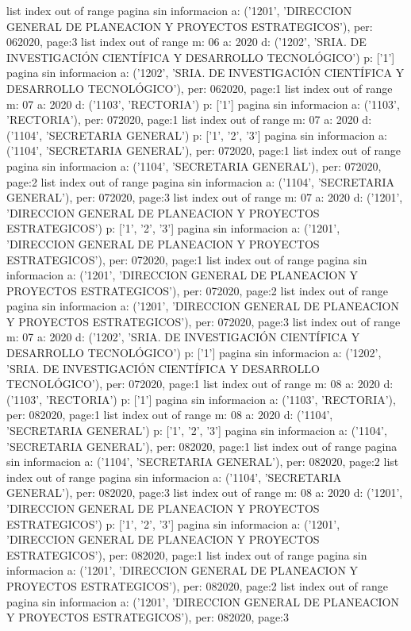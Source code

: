 \documentclass[11pt]{article}
\begin{document}
list index out of range
pagina sin informacion a: ('1201', 'DIRECCION GENERAL DE PLANEACION Y PROYECTOS ESTRATEGICOS'), per: 062020, page:3
list index out of range
m: 06 a: 2020 d: ('1202', 'SRIA. DE INVESTIGACIÓN CIENTÍFICA Y DESARROLLO TECNOLÓGICO') p: ['1']
pagina sin informacion a: ('1202', 'SRIA. DE INVESTIGACIÓN CIENTÍFICA Y DESARROLLO TECNOLÓGICO'), per: 062020, page:1
list index out of range
m: 07 a: 2020 d: ('1103', 'RECTORIA') p: ['1']
pagina sin informacion a: ('1103', 'RECTORIA'), per: 072020, page:1
list index out of range
m: 07 a: 2020 d: ('1104', 'SECRETARIA GENERAL') p: ['1', '2', '3']
pagina sin informacion a: ('1104', 'SECRETARIA GENERAL'), per: 072020, page:1
list index out of range
pagina sin informacion a: ('1104', 'SECRETARIA GENERAL'), per: 072020, page:2
list index out of range
pagina sin informacion a: ('1104', 'SECRETARIA GENERAL'), per: 072020, page:3
list index out of range
m: 07 a: 2020 d: ('1201', 'DIRECCION GENERAL DE PLANEACION Y PROYECTOS ESTRATEGICOS') p: ['1', '2', '3']
pagina sin informacion a: ('1201', 'DIRECCION GENERAL DE PLANEACION Y PROYECTOS ESTRATEGICOS'), per: 072020, page:1
list index out of range
pagina sin informacion a: ('1201', 'DIRECCION GENERAL DE PLANEACION Y PROYECTOS ESTRATEGICOS'), per: 072020, page:2
list index out of range
pagina sin informacion a: ('1201', 'DIRECCION GENERAL DE PLANEACION Y PROYECTOS ESTRATEGICOS'), per: 072020, page:3
list index out of range
m: 07 a: 2020 d: ('1202', 'SRIA. DE INVESTIGACIÓN CIENTÍFICA Y DESARROLLO TECNOLÓGICO') p: ['1']
pagina sin informacion a: ('1202', 'SRIA. DE INVESTIGACIÓN CIENTÍFICA Y DESARROLLO TECNOLÓGICO'), per: 072020, page:1
list index out of range
m: 08 a: 2020 d: ('1103', 'RECTORIA') p: ['1']
pagina sin informacion a: ('1103', 'RECTORIA'), per: 082020, page:1
list index out of range
m: 08 a: 2020 d: ('1104', 'SECRETARIA GENERAL') p: ['1', '2', '3']
pagina sin informacion a: ('1104', 'SECRETARIA GENERAL'), per: 082020, page:1
list index out of range
pagina sin informacion a: ('1104', 'SECRETARIA GENERAL'), per: 082020, page:2
list index out of range
pagina sin informacion a: ('1104', 'SECRETARIA GENERAL'), per: 082020, page:3
list index out of range
m: 08 a: 2020 d: ('1201', 'DIRECCION GENERAL DE PLANEACION Y PROYECTOS ESTRATEGICOS') p: ['1', '2', '3']
pagina sin informacion a: ('1201', 'DIRECCION GENERAL DE PLANEACION Y PROYECTOS ESTRATEGICOS'), per: 082020, page:1
list index out of range
pagina sin informacion a: ('1201', 'DIRECCION GENERAL DE PLANEACION Y PROYECTOS ESTRATEGICOS'), per: 082020, page:2
list index out of range
pagina sin informacion a: ('1201', 'DIRECCION GENERAL DE PLANEACION Y PROYECTOS ESTRATEGICOS'), per: 082020, page:3
\end{document}

